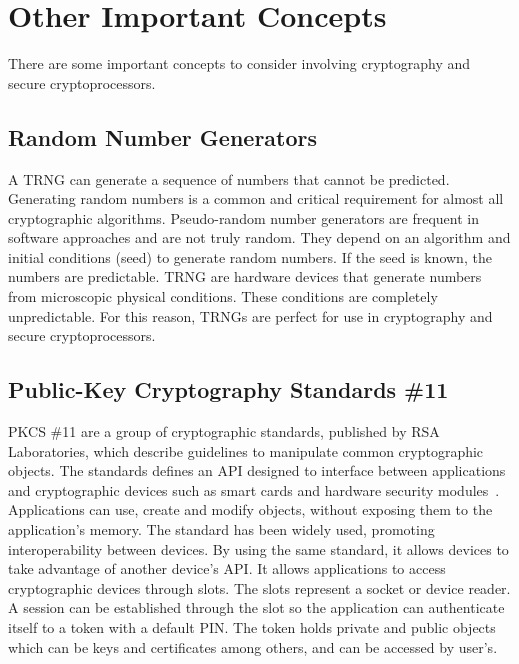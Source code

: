 \section{Other Important Concepts}\label{chap:background:other}

There are some important concepts to consider involving cryptography and secure cryptoprocessors.

\subsection{Random Number Generators}
A \ac{TRNG} can generate a sequence of numbers that cannot be predicted. Generating random numbers is a common and critical requirement for almost all cryptographic algorithms. Pseudo-random number generators are frequent in software approaches and are not truly random. They depend on an algorithm and initial conditions (seed) to generate random numbers. If the seed is known, the numbers are predictable.
\ac{TRNG} are hardware devices that generate numbers from microscopic physical conditions. These conditions are completely unpredictable. For this reason, \ac{TRNG}s are perfect for use in cryptography and secure cryptoprocessors.

\subsection{Public-Key Cryptography Standards \#11}
\ac{PKCS} \#11 are a group of cryptographic standards, published by RSA Laboratories, which describe guidelines to manipulate common cryptographic objects.
The standards defines an \ac{API} designed to interface between applications and cryptographic devices such as smart cards and hardware security modules~\cite{pkcs11analysis}. 
Applications can use, create and modify objects, without exposing them to the application's memory.
The standard has been widely used, promoting interoperability between devices. By using the same standard, it allows devices to take advantage of another device's \ac{API}.
It allows applications to access cryptographic devices through slots. The slots represent a socket or device reader. A session can be established through the slot so the application can authenticate itself to a token with a default \ac{PIN}. The token holds private and public objects which can be keys and certificates among others, and can be accessed by user's.
